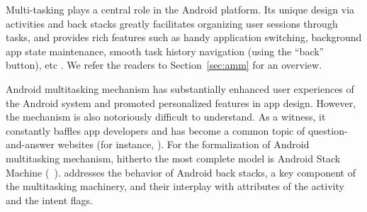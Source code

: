 

Multi-tasking plays a central role in the Android platform. Its unique design via activities and back stacks greatly facilitates organizing user sessions through tasks, and provides rich features such as handy application switching, background app state maintenance, smooth task history navigation (using the ``back'' button), etc \cite{RZXWL15}. We refer the readers to Section~\ref{sec:amm} for an overview. 

Android multitasking mechanism has substantially enhanced user experiences of the Android system and promoted personalized features in app design. However, the mechanism is also notoriously difficult to understand. As a witness, it constantly baffles app developers and has become a common topic of question-and-answer websites (for instance, \cite{stackoverflow}).
%
%
For the formalization of Android multitasking mechanism, hitherto the most complete %
model is Android Stack Machine ({\AMASS}~\cite{HC+19}). %
%
{\AMASS} addresses the behavior of Android back stacks, a key component of the multitasking machinery, and their interplay with attributes of the activity and the intent flags. 


